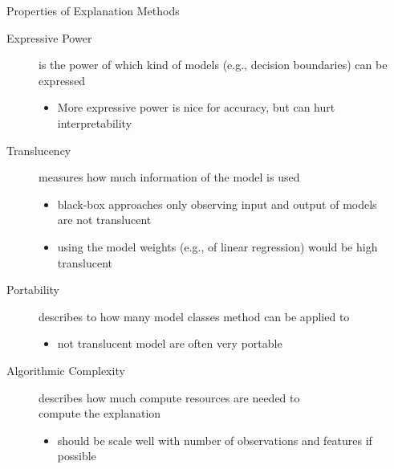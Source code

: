 \documentclass[aspectratio=169]{../latex_main/tntbeamer}  %
\begin{document}
\begin{frame}[c]{Properties of Explanation Methods }
	
	\begin{description}
        \item[Expressive Power] is the power of which kind of models (e.g., decision boundaries) can be expressed 
        \begin{itemize}
            \item More expressive power is nice for accuracy, but can hurt interpretability
        \end{itemize}
        \medskip
        \pause
        \item[Translucency] measures how much information of the model is used
        \begin{itemize}
            \item black-box approaches only observing input and output of models\\ are not translucent
            \item using the model weights (e.g., of linear regression) would be high translucent
        \end{itemize}
        \medskip
        \pause
        \item[Portability] describes to how many model classes method can be applied to
        \begin{itemize}
            \item not translucent model are often very portable
        \end{itemize}
        \medskip
        \pause
        \item[Algorithmic Complexity] describes how much compute resources are needed to\\ compute the explanation
        \begin{itemize}
            \item should be scale well with number of observations and features if possible
        \end{itemize}
        
	\end{description}
\end{frame}
\end{document}
